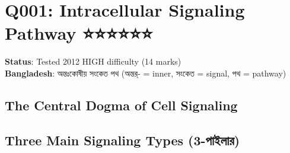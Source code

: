 \hypertarget{q001-intracellular-signaling-pathway}{%
\section{Q001: Intracellular Signaling Pathway
⭐⭐⭐⭐⭐⭐}\label{q001-intracellular-signaling-pathway}}

\textbf{Status}: Tested 2012 \textbar{} HIGH difficulty (14 marks)\\
\textbf{Bangladesh}: অন্তঃকোষীয় সংকেত পথ (অন্তর্- = inner, সংকেত = signal,
পথ = pathway)

\hypertarget{the-central-dogma-of-cell-signaling}{%
\subsection{\texorpdfstring{\textbf{The Central Dogma of Cell
Signaling}}{The Central Dogma of Cell Signaling}}\label{the-central-dogma-of-cell-signaling}}

\begin{Shaded}
\begin{Highlighting}[]
\end{Highlighting}
\end{Shaded}

\hypertarget{three-main-signaling-types-3-ux9aaux987ux9b2ux9b0}{%
\subsection{\texorpdfstring{\textbf{Three Main Signaling Types
(3-পাইলার)}}{Three Main Signaling Types (3-পাইলার)}}\label{three-main-signaling-types-3-ux9aaux987ux9b2ux9b0}}

